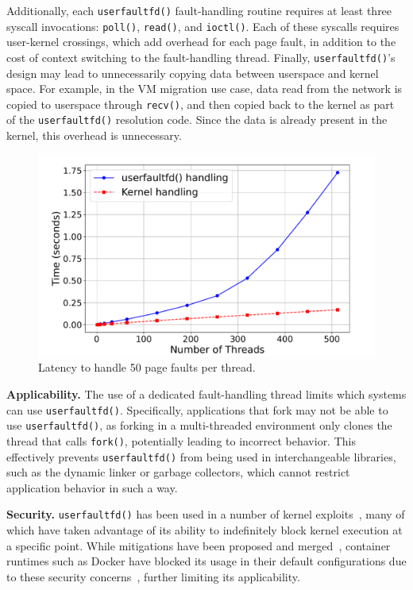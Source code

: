 Additionally, each \texttt{userfaultfd()} fault-handling routine requires at least three syscall invocations: \texttt{poll()}, \texttt{read()}, and \texttt{ioctl()}. Each of these syscalls requires user-kernel crossings, which add overhead for each page fault, in addition to the cost of context switching to the fault-handling thread. Finally, \texttt{userfaultfd()}'s design may lead to unnecessarily copying data between userspace and kernel space. For example, in the VM migration use case, data read from the network is copied to userspace through \texttt{recv()}, and then copied back to the kernel as part of the \texttt{userfaultfd()} resolution code. Since the data is already present in the kernel, this overhead is unnecessary.


\begin{figure}[h]
    \centering
    \includegraphics[clip,scale=0.33]{figures/uffd-scalability-motivation.pdf}
    \caption{Latency to handle 50 page faults per thread.}
    \label{fig:motivation-scalability}
\end{figure}

\textbf{Applicability.} The use of a dedicated fault-handling thread limits which systems can use \texttt{userfaultfd()}.
Specifically, applications that fork may not be able to use \texttt{userfaultfd()}, as forking in a multi-threaded environment only clones the thread that calls \texttt{fork()}, potentially leading to incorrect behavior.
This effectively prevents \texttt{userfaultfd()} from being used in interchangeable libraries, such as the dynamic linker or garbage collectors, which cannot restrict application behavior in such a way.

\textbf{Security.} \texttt{userfaultfd()} has been used in a number of kernel exploits~\cite{uffd-blocking,dirtycred,linux-heap-cve,linux-heap-spray,linux-uaf-cve}, many of which have taken advantage of its ability to indefinitely block kernel execution at a specific point. While mitigations have been proposed and merged~\cite{uffd-blocking}, container runtimes such as Docker have blocked its usage in their default configurations due to these security concerns~\cite{docker-seccomp}, further limiting its applicability.